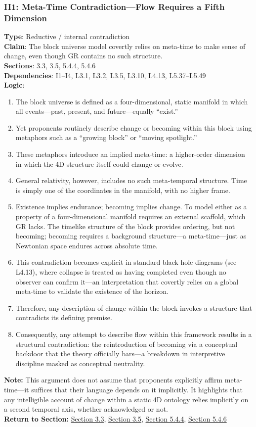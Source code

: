 \documentclass[12pt]{book}
\begin{document}
\subsubsection*{II1: Meta-Time Contradiction---Flow Requires a Fifth Dimension}
\label{appendix:II1}
\textbf{Type}: Reductive / internal contradiction\\
\textbf{Claim}: The block universe model covertly relies on meta-time to make sense of change, even though GR contains no such structure. \\
\textbf{Sections}: 3.3, 3.5, 5.4.4, 5.4.6\\
\textbf{Dependencies}: I1–I4, L3.1, L3.2, L3.5, L3.10, L4.13, L5.37–L5.49\\
\textbf{Logic}:
\begin{enumerate}
    \item The block universe is defined as a four-dimensional, static manifold in which all events---past, present, and future---equally ``exist.''
    \item Yet proponents routinely describe change or becoming within this block using metaphors such as a ``growing block'' or ``moving spotlight.''
    \item These metaphors introduce an implied meta-time: a higher-order dimension in which the 4D structure itself could change or evolve.
    \item General relativity, however, includes no such meta-temporal structure. Time is simply one of the coordinates in the manifold, with no higher frame.
    \item Existence implies endurance; becoming implies change. To model either as a property of a four-dimensional manifold requires an external scaffold, which GR lacks. The timelike structure of the block provides ordering, but not becoming; becoming requires a background structure---a meta-time---just as Newtonian space endures across absolute time.
    \item This contradiction becomes explicit in standard black hole diagrams (see L4.13), where collapse is treated as having completed even though no observer can confirm it---an interpretation that covertly relies on a global meta-time to validate the existence of the horizon.
    \item Therefore, any description of change within the block invokes a structure that contradicts its defining premise.
    \item Consequently, any attempt to describe flow within this framework results in a structural contradiction: the reintroduction of becoming via a conceptual backdoor that the theory officially bars---a breakdown in interpretive discipline masked as conceptual neutrality.
\end{enumerate}
\textbf{Note:} This argument does not assume that proponents explicitly affirm meta-time---it suffices that their language depends on it implicitly. It highlights that any intelligible account of change within a static 4D ontology relies implicitly on a second temporal axis, whether acknowledged or not.\\
\textbf{Return to Section:} \hyperref[sec:3.3]{Section 3.3}, \hyperref[sec:3.5]{Section 3.5}, \hyperref[sec:5.4.4]{Section 5.4.4}, \hyperref[sec:5.4.6]{Section 5.4.6}
\end{document}
